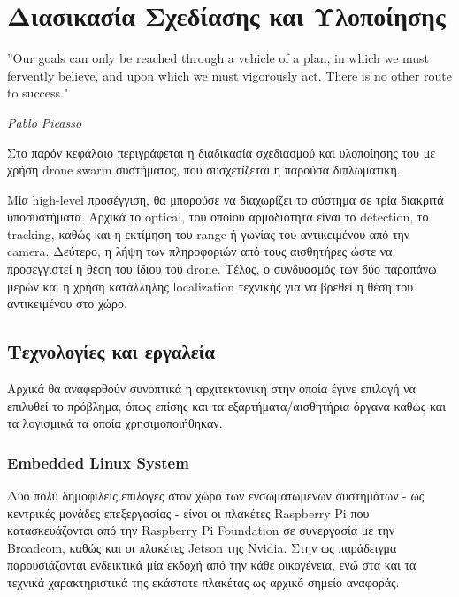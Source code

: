 \chapter{Διασικασία Σχεδίασης και Υλοποίησης} %
\label{chap:Chapter4}  %

\epigraph{”Our goals can only be reached through a vehicle of a plan, in which we must fervently believe, and upon which we must vigorously act. There is no other route to success." }{\textit{Pablo Picasso}}

Στο παρόν κεφάλαιο περιγράφεται η διαδικασία σχεδιασμού και υλοποίησης του  με χρήση drone swarm συστήματος, που συσχετίζεται η παρούσα διπλωματική. 

Μία high-level προσέγγιση, θα μπορούσε να διαχωρίζει το σύστημα σε τρία διακριτά
υποσυστήματα. Αρχικά το optical, του οποίου αρμοδιότητα είναι το detection, το tra\-cking, καθώς και η εκτίμηση
του range ή γωνίας του αντικειμένου από την camera. Δεύτερο, η λήψη των πληροφοριών από τους αισθητήρες ώστε να προσεγγιστεί η θέση του ίδιου
του drone. Τέλος, ο συνδυασμός των δύο παραπάνω μερών και η χρήση κατάλληλης localization τεχνικής για να βρεθεί η θέση του αντικειμένου
στο  χώρο.

\section{Τεχνολογίες και εργαλεία} \label{sec:design-tools}
Αρχικά θα αναφερθούν συνοπτικά η αρχιτεκτονική στην οποία έγινε επιλογή να επιλυθεί το πρόβλημα,
όπως επίσης και τα εξαρτήματα/αισθητήρια όργανα καθώς και τα λογισμικά τα οποία χρησιμοποιήθηκαν. 

\subsection{Embedded Linux System}
Δύο πολύ δημοφιλείς επιλογές στον χώρο των ενσωματωμένων συστημάτων - ως κεντρικές μονάδες επεξεργασίας - είναι οι πλακέτες Raspberry Pi που κατασκευάζονται από την Raspberry Pi Foundation σε συνεργασία με την Broadcom, καθώς και οι πλακέτες Jetson της Nvidia. Στην  ως παράδειγμα παρουσιάζονται ενδεικτικά μία εκδοχή από την κάθε οικογένεια, ενώ στα  και  τα τεχνικά χαρακτηριστικά της εκάστοτε πλακέτας ως αρχικό σημείο αναφοράς. 


